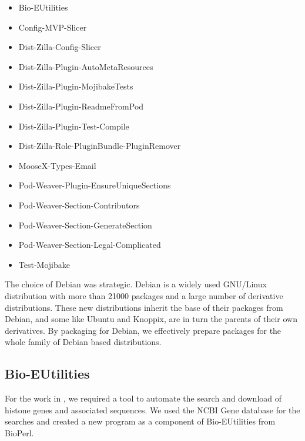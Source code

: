 \begin{table}
  \label{tab:software:debian-packages}
  \begin{itemize}
  \item Bio-EUtilities
  \item Config-MVP-Slicer
  \item Dist-Zilla-Config-Slicer
  \item Dist-Zilla-Plugin-AutoMetaResources
  \item Dist-Zilla-Plugin-MojibakeTests
  \item Dist-Zilla-Plugin-ReadmeFromPod
  \item Dist-Zilla-Plugin-Test-Compile
  \item Dist-Zilla-Role-PluginBundle-PluginRemover
  \item MooseX-Types-Email
  \item Pod-Weaver-Plugin-EnsureUniqueSections
  \item Pod-Weaver-Section-Contributors
  \item Pod-Weaver-Section-GenerateSection
  \item Pod-Weaver-Section-Legal-Complicated
  \item Test-Mojibake
  \end{itemize}
\end{table}


The choice of Debian was strategic.  Debian is a widely used GNU/Linux
distribution with more than 21000 packages and a large
number of derivative distributions.  These new distributions
inherit the base of their packages from Debian, and some like Ubuntu
and Knoppix, are in turn the parents of their own derivatives.  By packaging
for Debian, we effectively prepare packages for the whole family of
Debian based distributions.

\subsection{Bio-EUtilities}

For the work in , we required a tool to
automate the search and download of histone genes and associated sequences.
We used the NCBI Gene database for the searches and
created a new program as a component of Bio-EUtilities from BioPerl.

